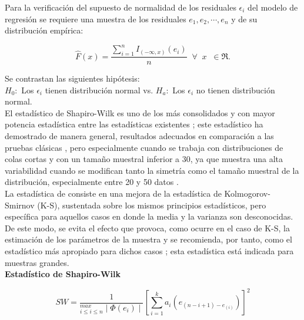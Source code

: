 Para la verificación del supuesto de normalidad de los residuales $\epsilon_i$ del modelo de regresión se requiere una muestra de los residuales $e_1, e_2, \cdots, e_n$ y de su distribución empírica:\\


\begin{center}
	$$\hat{F}(x)=\frac{\sum_{i=1}^n I_{(- \infty,x)}(e_i)}{n}  \;\; \forall \;\; x \;\; \in \Re.$$
\end{center}

Se contrastan las siguientes hipótesis:\\

$H_0:$ Los $\epsilon_i$ tienen distribución normal vs. $H_a:$ Los $\epsilon_i$ no tienen distribución normal.\\

El estadístico de Shapiro-Wilk es uno de los más consolidados y con mayor potencia estadística entre las estadísticas existentes \parencite{arcone-2006}; este estadístico ha demostrado de manera general, resultados adecuados en comparación a las pruebas clásicas \parencite{arcone-2006}, pero especialmente cuando se trabaja con distribuciones de colas cortas \parencite{thadewald-2007} y con un tamaño muestral inferior a 30, ya que muestra una alta variabilidad cuando se modifican tanto la simetría como el tamaño muestral de la distribución, especialmente entre 20 y 50 datos \parencite{yazici-2007}.\\

La estadística de \textcite{Lilliefors-1967} consiste en una mejora de la estadística de Kolmogorov- Smirnov (K-S), sustentada sobre los mismos principios estadísticos, pero específica para aquellos casos en donde la media y la varianza son desconocidas. De este modo, se evita el efecto que provoca, como ocurre en el caso de K-S, la estimación de los parámetros de la muestra \parencite{steinskog-2007} y se recomienda, por tanto, como el estadístico más apropiado para dichos casos \parencite{oztuna-2006}; esta estadística está indicada para muestras grandes.\\


\textbf{Estadístico de Shapiro-Wilk}


\begin{center}
 $$SW=\frac{1}{^{max}_{i\leq i \leq n} \mid \Phi (e_i) \mid}[\sum_{i=1}^k a_i(e_{(n-i+1)-e_(i)})]^2$$
\end{center}


